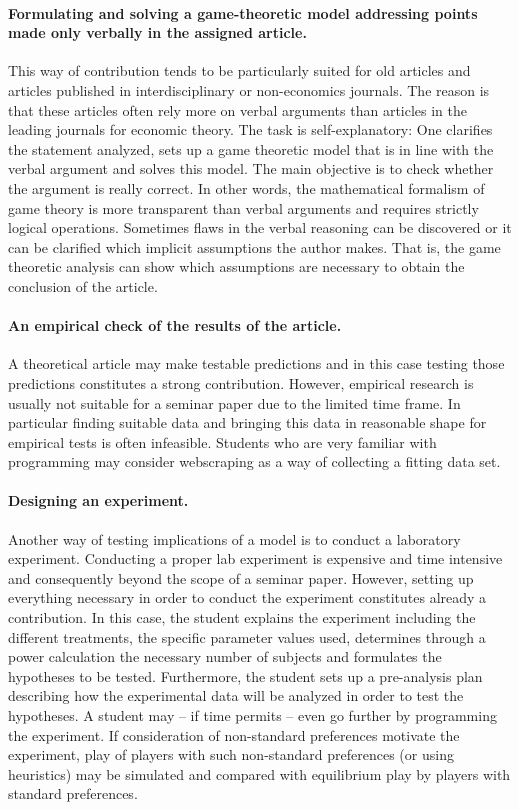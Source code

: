 \documentclass[a4paper,11pt]{article}
\begin{document}
\paragraph{Formulating and solving a game-theoretic model addressing points made only verbally in the assigned article.} This way of contribution tends to be particularly suited for old articles and articles published in interdisciplinary or non-economics journals. The reason is that these articles often rely more on verbal arguments than articles in the leading journals for economic theory. The task is self-explanatory: One clarifies the statement analyzed, sets up a game theoretic model that is in line with the verbal argument and solves this model. The main objective is to check whether the argument is really correct. In other words, the mathematical formalism of game theory is more transparent than verbal arguments and requires strictly logical operations. Sometimes flaws in the verbal reasoning can be discovered or it can be clarified which implicit assumptions the author makes. That is, the game theoretic analysis can show which assumptions are necessary to obtain the conclusion of the article.

\paragraph{An empirical check of the results of the article.} A theoretical article may make testable predictions and in this case testing those predictions constitutes a strong contribution. However, empirical research is usually not suitable for a seminar paper due to the limited time frame. In particular finding suitable data and bringing this data in reasonable shape for empirical tests is often infeasible. Students who are very familiar with programming may consider webscraping as a way of collecting a fitting data set. 

\paragraph{Designing an experiment.} Another way of testing implications of a model is to conduct a laboratory experiment. Conducting a proper lab experiment is expensive and time intensive and consequently beyond the scope of a seminar paper. However, setting up everything necessary in order to conduct the experiment constitutes already a contribution. In this case, the student explains the experiment including the different treatments, the specific parameter values used, determines through a power calculation the necessary number of subjects and formulates the hypotheses to be tested. Furthermore, the student sets up a pre-analysis plan describing how the experimental data will be analyzed in order to test the hypotheses. A student may -- if time permits -- even go further by programming the experiment. If consideration of non-standard preferences motivate the experiment, play of players with such non-standard preferences (or using heuristics) may be simulated and compared with equilibrium play by players with standard preferences.
\end{document}
